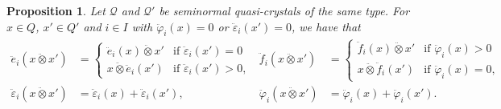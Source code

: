 \documentclass[a4paper,reqno]{amsart}
\numberwithin{equation}{section}
\theoremstyle{plain}
\newtheorem{prop}[thm]{Proposition}
\theoremstyle{definition}
\theoremstyle{remark}
\newcommand*{\qcrst}[1]{\mathcal{#1}}
\newcommand*{\qcrstQ}{\qcrst{Q}}
\newcommand*{\qKoe}{\ddot{e}}
\newcommand*{\qKof}{\ddot{f}}
\newcommand*{\qKoec}{\ddot{\varepsilon}}
\newcommand*{\qKofc}{\ddot{\varphi}}
\newcommand*{\dotimes}{\mathbin{\ddot{\otimes}}}  %
\begin{document}
\begin{prop}
\label{prop:qcqtpalt}
Let $\qcrstQ$ and $\qcrstQ'$ be seminormal quasi-crystals of the same type.
For $x \in Q$, $x' \in Q'$ and $i \in I$ with $\qKofc_i (x) = 0$ or $\qKoec_i (x') = 0$, we have that
\begin{align*}
\qKoe_i (x \dotimes x') &=
   \begin{cases}
      \qKoe_i (x) \dotimes x' & \text{if $\qKoec_i (x') = 0$}\\
      x \dotimes \qKoe_i (x') & \text{if $\qKoec_i (x') > 0$,}
   \end{cases}
&
\qKof_i (x \dotimes x') &=
   \begin{cases}
      \qKof_i (x) \dotimes x' & \text{if $\qKofc_i (x) > 0$}\\
      x \dotimes \qKof_i (x') & \text{if $\qKofc_i (x) = 0$,}
   \end{cases}\\
\qKoec_i (x \dotimes x') &= \qKoec_i (x) + \qKoec_i (x'),
&
\qKofc_i (x \dotimes x') &= \qKofc_i (x) + \qKofc_i (x').
\end{align*}
\end{prop}
\end{document}
